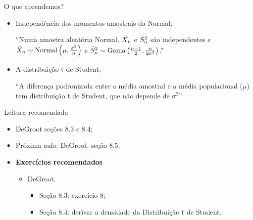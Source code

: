 \begin{frame}{O que aprendemos?}
\begin{itemize}

  \item[\faLightbulbO] Independência dos momentos amostrais da Normal;    
  
   ``Numa amostra aleatória Normal, $\bar{X}_n$ e $\bar{S}^2_n$ são independentes e $\bar{X}_n \sim \operatorname{Normal}\left(\mu, \frac{\sigma^2}{n}\right)$ e $\bar{S}^2_n \sim \operatorname{Gama}\left(\frac{n-1}{2},  \frac{n}{2\sigma^2}\right)$.''  
     
   \item[\faLightbulbO] A distribuição t de Student;
   
   ``A diferença padronizada entre a média amostral e a média populacional ($\mu$) tem distribuição t de Student, que não depende de $\sigma^2$''
    
  \end{itemize}
 \end{frame}

\begin{frame}{Leitura recomendada}
\begin{itemize}
 \item[\faBook] DeGroot seções 8.3 e 8.4;
 \item[\faForward] Próxima aula: DeGroot, seção 8.5;
 \item {\large\textbf{Exercícios recomendados}}
 \begin{itemize}
  \item[\faBookmark] DeGroot.
  \begin{itemize}
   \item Seção 8.3: exercício 8;
   \item Seção 8.4: derivar a densidade da Distribuição t de Student.
  \end{itemize}   
  \end{itemize}
 \end{itemize} 
\end{frame}
